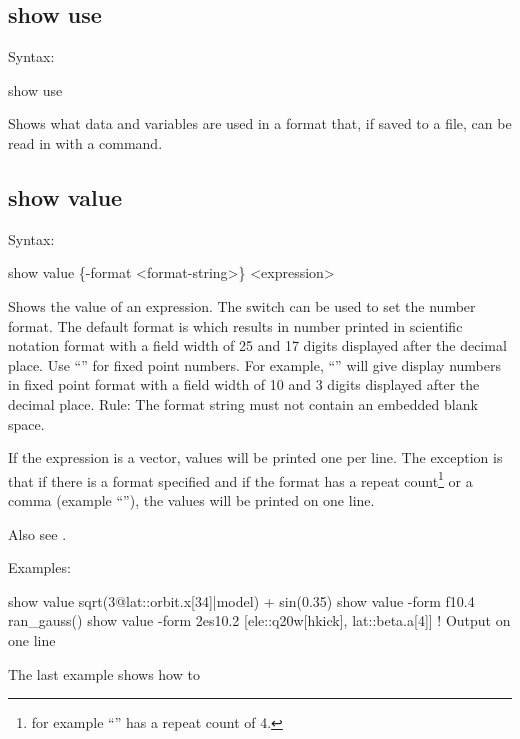 {{{{{{{{{{%

\subsection{show use}
\label{s:show.use}

Syntax:
\begin{example}
  show use
\end{example}

Shows what data and variables are used in a format that, if saved to a file, can be read
in with a  command.


\subsection{show value}
\label{s:show.value}

Syntax:
\begin{example}
  show value \{-format <format-string>\} <expression>
\end{example}

Shows the value of an expression. The  switch can be used to set the number format.  The
default format is  which results in number printed in scientific notation format with a
field width of 25 and 17 digits displayed after the decimal place. Use ``'' for fixed point
numbers. For example, ``'' will give display numbers in fixed point format with a field
width of 10 and 3 digits displayed after the decimal place. Rule: The format string must not contain
an embedded blank space.

If the expression is a vector, values will be printed one per line. The exception is that if there
is a format specified and if the format has a repeat count\footnote
  {
for example ``'' has a repeat count of 4.
  }
or a comma (example ``''), the values will be printed on one line.

Also see .

Examples:
\begin{example}
  show value sqrt(3@lat::orbit.x[34]|model) + sin(0.35)
  show value -form f10.4 ran_gauss()
  show value -form 2es10.2 [ele::q20w[hkick], lat::beta.a[4]] ! Output on one line
\end{example}
The last example shows how to 


}}}}}}}}}}

